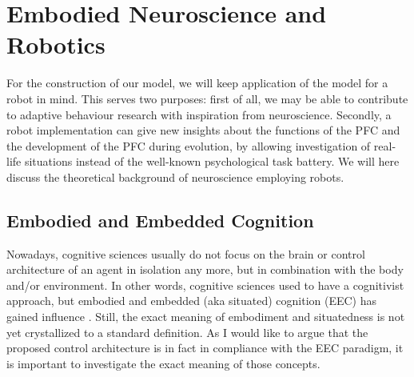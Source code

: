 \documentclass[10pt,a4paper]{report}
\begin{document}
\section{Embodied Neuroscience and Robotics}
For the construction of our model, we will keep application of the model for a robot in mind. This serves two purposes: first of all, we may be able to contribute to adaptive behaviour research with inspiration from neuroscience. Secondly, a robot implementation can give new insights about the functions of the PFC and the development of the PFC during evolution, by allowing investigation of real-life situations instead of the well-known psychological task battery. We will here discuss the theoretical background of neuroscience employing robots.

\subsection*{Embodied and Embedded Cognition}
Nowadays, cognitive sciences usually do not focus on the brain or control architecture of an agent in isolation any more, but in combination with the body and/or environment. In other words, cognitive sciences used to have a cognitivist approach, but embodied and embedded (aka situated) cognition (EEC) has gained influence \citep{Dijk2008}. Still, the exact meaning of embodiment and situatedness is not yet crystallized to a standard definition. As I would like to argue that the proposed control architecture is in fact in compliance with the EEC paradigm, it is important to investigate the exact meaning of those concepts. 
\end{document}
